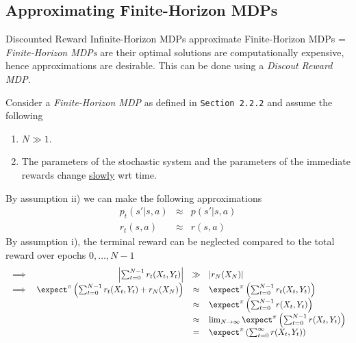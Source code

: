 \documentclass[11pt,a4paper]{article}
\begin{document}
\subsection*{Approximating Finite-Horizon MDPs}

  \begin{proposition}{Discounted Reward Infinite-Horizon MDPs approximate Finite-Horizon MDPs}
    \everymath={\displaystyle}
    \textit{Finite-Horizon MDPs} are their optimal solutions are computationally expensive, hence approximations are desirable. This can be done using a \textit{Discout Reward MDP}.
    \par Consider a \textit{Finite-Horizon MDP} as defined in \texttt{Section 2.2.2} and assume the following
    \begin{enumerate}
      \item $N\gg1$.
      \item The parameters of the stochastic system and the parameters of the immediate rewards change \underline{slowly} wrt time.
    \end{enumerate}
    By assumption ii) we can make the following approximations
    \[\begin{array}{rcl}
      p_t(s'|s,a)&\approx&p(s'|s,a)\\
      r_t(s,a)&\approx&r(s,a)
    \end{array}\]
    By assumption i), the terminal reward can be neglected compared to the total reward over epochs $0,\dots,N-1$
    \[\begin{array}{rrcl}
      \implies&\left|\sum_{t=0}^{N-1}r_t(X_t,Y_t)\right|&\gg&|r_N(X_N)|\\
      \implies&\expect^\pi\left(\sum_{t=0}^{N-1}r_t(X_t,Y_t)+r_N(X_N)\right)&\approx&\expect^\pi\left(\sum_{t=0}^{N-1}r_t(X_t,Y_t)\right)\\
      &&\approx&\expect^\pi\left(\sum_{t=0}^{N-1}r(X_t,Y_t)\right)\\
      &&\approx&\lim_{N\to\infty}\expect^\pi\left(\sum_{t=0}^{N-1}r(X_t,Y_t)\right)\\
      &&=&\expect^\pi\left(\sum_{t=0}^\infty r(X_t,Y_t)\right)
    \end{array}\]
  \end{proposition}
\end{document}
